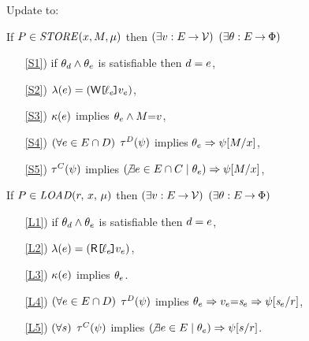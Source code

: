 \begin{definition}[$\xRecycle$/$\xIF$]
  \label{def:pomsets-if}
  Update  to:

  If $\aPS \in \sSTOREtight[\amode]{\aLoc}{\aExp}$ then
  $(\exists v:E\mathbin\rightarrow\mathcal{V})$
  $(\exists\theta:E\mathbin\rightarrow\Phi)$
  \begin{enumerate}
  \item[\ref{S1})] if $\theta_d\land\theta_e$ is satisfiable then $d=e$,
  \item[\ref{S2})] $\labelingAct(\aEv) = \DWREFP{\cVal_\aEv}{\aVal_\aEv}$,
  \item[\ref{S3})] $\kappa(e)$ implies $\theta_e \land M{=}v$,
  \item[\ref{S4})] $(\forall e\in E\cap D)$
    $\aTr{\bEvs}{\bForm}$ implies $\theta_e \Rightarrow \psi[M/x]$,
  \item[\ref{S5})] 
    $\aTr{\cEvs}{\bForm}$ implies $(\!\not\exists e\in E\cap C \mid \theta_e) \Rightarrow \psi[M/x]$,
  \end{enumerate}

  If $\aPS \in \sLOAD[\amode]{\aReg}{\aLoc}$ then
  $(\exists v:E\mathbin\rightarrow\mathcal{V})$
  $(\exists\theta:E\mathbin\rightarrow\Phi)$
  \begin{enumerate}
  \item[\ref{L1})] 
    if $\theta_d\land\theta_e$ is satisfiable then $d=e$,
  \item[\ref{L2})] 
    $\labelingAct(\aEv) = \DRREFP{\cVal_\aEv}{\aVal_\aEv}$,
  \item[\ref{L3})] 
    $\kappa(e)$ implies $\theta_e$.
  \item[\ref{L4})] 
    $(\forall e\in E\cap D)$
    $\aTr{\bEvs}{\bForm}$ implies $\theta_e \Rightarrow v_e{=}\mathit{s}_{e}\Rightarrow\psi[\mathit{s}_{e}/r]$, 
  \item[\ref{L5})]
    $(\forall s)$
    $\aTr{\cEvs}{\bForm}$ implies $(\!\not\exists e\in E \mid \theta_e) \Rightarrow \psi[s/r]$. 
  \end{enumerate}  
\end{definition}

